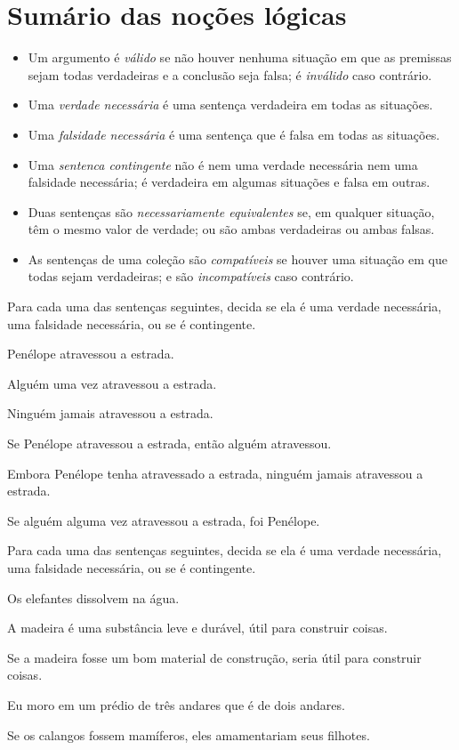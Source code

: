 \section*{Sumário das noções lógicas}

\begin{itemize}
\item Um argumento é \textit{válido} se não houver nenhuma situação em que as premissas sejam todas verdadeiras e a conclusão seja falsa; é \textit{inválido} caso contrário.

\item Uma \textit{verdade necessária} é uma sentença verdadeira em todas as situações.

\item Uma \textit{falsidade necessária} é uma sentença que é falsa em todas as situações.

\item Uma \textit{sentenca contingente} não é nem uma verdade necessária nem uma falsidade necessária; é verdadeira em algumas situações e falsa em outras.

\item Duas sentenças são \textit{necessariamente equivalentes} se, em qualquer situação, têm o mesmo valor de verdade; ou são ambas verdadeiras ou ambas falsas.

\item As sentenças de uma coleção são \textit{compatíveis} se houver uma situação em que todas sejam verdadeiras; e são \textit{incompatíveis} caso contrário.
\end{itemize}


\practiceproblems
\problempart
\label{pr.EnglishTautology2}
Para cada uma das sentenças seguintes, decida se ela é uma verdade necessária, uma falsidade necessária, ou se é contingente.
\begin{earg}
\item Penélope atravessou a estrada.
\item Alguém uma vez atravessou a estrada.
\item Ninguém jamais atravessou a estrada.
\item Se Penélope atravessou a estrada, então alguém atravessou.
\item Embora Penélope tenha atravessado a estrada, ninguém jamais atravessou a estrada.
\item Se alguém alguma vez atravessou a estrada, foi Penélope.
\end{earg}

\problempart
Para cada uma das sentenças seguintes, decida se ela é uma verdade necessária, uma falsidade necessária, ou se é contingente.
\begin{earg}
\item Os elefantes dissolvem na água.
\item A madeira é uma substância leve e durável, útil para construir coisas.
\item Se a madeira fosse um bom material de construção, seria útil para construir coisas.
\item Eu moro em um prédio de três andares que é de dois andares.
\item Se os calangos fossem mamíferos, eles amamentariam seus filhotes.
\end{earg}

